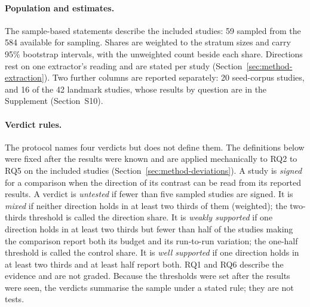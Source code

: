 \paragraph{Population and estimates.} The sample-based statements describe the included studies: 59 sampled from the 584 available for sampling. Shares are weighted to the stratum sizes and carry 95\% bootstrap intervals, with the unweighted count beside each share. Directions rest on one extractor's reading and are stated per study (Section~\ref{sec:method-extraction}). Two further columns are reported separately: 20 seed-corpus studies, and 16 of the 42 landmark studies, whose results by question are in the Supplement (Section~S10).%
\paragraph{Verdict rules.} The protocol names four verdicts but does not define them. The definitions below were fixed after the results were known and are applied mechanically to RQ2 to RQ5 on the included studies (Section~\ref{sec:method-deviations}). A study is \emph{signed} for a comparison when the direction of its contrast can be read from its reported results. A verdict is \emph{untested} if fewer than five sampled studies are signed. It is \emph{mixed} if neither direction holds in at least two thirds of them (weighted); the two-thirds threshold is called the direction share. It is \emph{weakly supported} if one direction holds in at least two thirds but fewer than half of the studies making the comparison report both its budget and its run-to-run variation; the one-half threshold is called the control share. It is \emph{well supported} if one direction holds in at least two thirds and at least half report both. RQ1 and RQ6 describe the evidence and are not graded. Because the thresholds were set after the results were seen, the verdicts summarise the sample under a stated rule; they are not tests.

